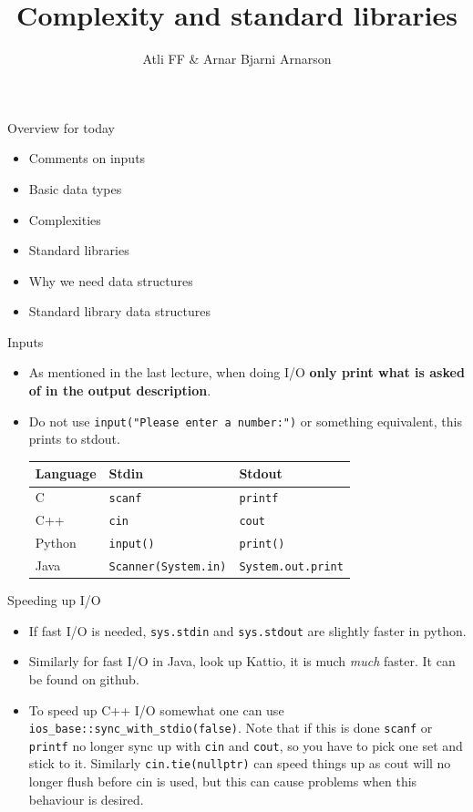 \documentclass{beamer}
\title{Complexity and standard libraries}
\author{Atli FF \& Arnar Bjarni Arnarson}
\institute{\href{http://ru.is/td}{School of Computer Science} \\[2pt] \href{http://ru.is}{Reykjavík University}}
\begin{document}
\maketitle


\begin{frame}[plain]{Overview for today}
    \vspace{20pt}
    \begin{itemize}
        \item Comments on inputs
        \item Basic data types
        \item Complexities
        \item Standard libraries
        \item Why we need data structures
        \item Standard library data structures
    \end{itemize}
\end{frame}

\begin{frame}[plain]{Inputs}
    \begin{itemize}
        \item As mentioned in the last lecture, when doing I/O \textbf{only print what is asked of in the output description}.
        \item Do not use \texttt{input("Please enter a number:")} or something equivalent, this prints to stdout.
        \vspace{15pt}
        \begin{tabular}{l|l|l}
            Language & Stdin & Stdout \\ \hline
            C & \texttt{scanf} & \texttt{printf} \\
            C++ & \texttt{cin} & \texttt{cout} \\
            Python & \texttt{input()} & \texttt{print()} \\
            Java & \texttt{Scanner(System.in)} & \texttt{System.out.print} \\
        \end{tabular}
    \end{itemize}
\end{frame}

\begin{frame}[plain]{Speeding up I/O}
    \begin{itemize}
        \item If fast I/O is needed, \texttt{sys.stdin} and \texttt{sys.stdout} are slightly faster in python.
        \item Similarly for fast I/O in Java, look up Kattio, it is much \textit{much} faster. It can be found on github.
        \item To speed up C++ I/O somewhat one can use \texttt{ios\_{}base::sync\_{}with\_{}stdio(false)}. Note that if this is done \texttt{scanf} or \texttt{printf} no longer sync up with \texttt{cin} and \texttt{cout}, so you have to pick one set and stick to it. Similarly \texttt{cin.tie(nullptr)} can speed things up as cout will no longer flush before cin is used, but this can cause problems when this behaviour is desired.
    \end{itemize}
\end{frame}
\end{document}

